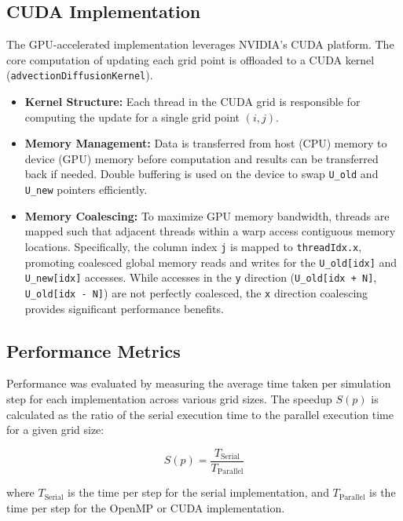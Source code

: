 \documentclass[conference]{IEEEtran}
\begin{document}
\subsection{CUDA Implementation}
The GPU-accelerated implementation leverages NVIDIA's CUDA platform. The core computation of updating each grid point is offloaded to a CUDA kernel (\texttt{advectionDiffusionKernel}).
\begin{itemize}
    \item \textbf{Kernel Structure:} Each thread in the CUDA grid is responsible for computing the update for a single grid point \((i, j)\).
    \item \textbf{Memory Management:} Data is transferred from host (CPU) memory to device (GPU) memory before computation and results can be transferred back if needed. Double buffering is used on the device to swap \texttt{U\_old} and \texttt{U\_new} pointers efficiently.
    \item \textbf{Memory Coalescing:} To maximize GPU memory bandwidth, threads are mapped such that adjacent threads within a warp access contiguous memory locations. Specifically, the column index \texttt{j} is mapped to \texttt{threadIdx.x}, promoting coalesced global memory reads and writes for the \texttt{U\_old[idx]} and \texttt{U\_new[idx]} accesses. While accesses in the \texttt{y} direction (\texttt{U\_old[idx + N]}, \texttt{U\_old[idx - N]}) are not perfectly coalesced, the \texttt{x} direction coalescing provides significant performance benefits.
\end{itemize}

\subsection{Performance Metrics}
Performance was evaluated by measuring the average time taken per simulation step for each implementation across various grid sizes. The speedup \(S(p)\) is calculated as the ratio of the serial execution time to the parallel execution time for a given grid size:

\begin{equation}
S(p) = \frac{T_{\text{Serial}}}{T_{\text{Parallel}}}
\end{equation}

where \(T_{\text{Serial}}\) is the time per step for the serial implementation, and \(T_{\text{Parallel}}\) is the time per step for the OpenMP or CUDA implementation.
\end{document}
